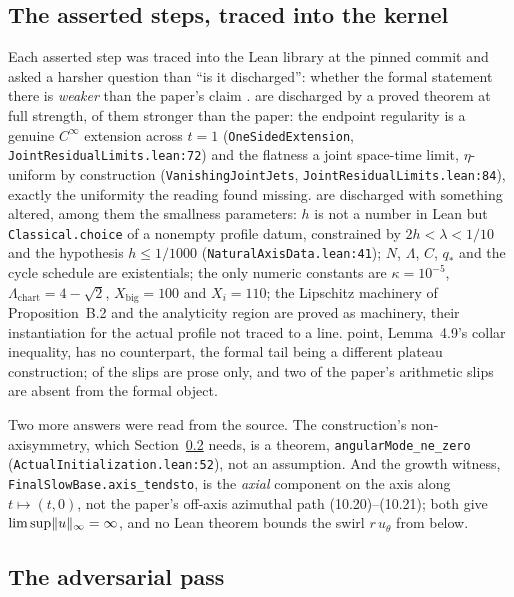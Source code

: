 \documentclass[11pt]{article}
\newcommand{\lean}[1]{\texttt{#1}}
\begin{document}
\subsection{The asserted steps, traced into the kernel}\label{sec:traced}

Each asserted step was traced into the Lean library at the pinned commit and asked a harsher
question than ``is it discharged'': whether the formal statement there is \emph{weaker}
than the paper's claim \cite{Records}. \TracedFull{} are discharged by a proved theorem at
full strength, \TracedStronger{} of them stronger than the paper: the endpoint regularity is
a genuine $C^\infty$ extension across $t=1$ (\lean{OneSidedExtension},
\lean{JointResidualLimits.lean:72}) and the flatness a joint space-time limit,
$\eta$-uniform by construction (\lean{VanishingJointJets},
\lean{JointResidualLimits.lean:84}), exactly the uniformity the reading found missing.
\TracedAltered{} are discharged with something altered, among them the smallness
parameters: $h$ is not a number in Lean but \lean{Classical.choice} of a nonempty profile
datum, constrained by $2h<\lambda<1/10$ and the hypothesis $h\le1/1000$
(\lean{NaturalAxisData.lean:41}); $N$, $\Lambda$, $C$, $q_*$ and the cycle schedule are
existentials; the only numeric constants are $\kappa=10^{-5}$,
$\Lambda_{\mathrm{chart}}=4-\sqrt2$, $X_{\mathrm{big}}=100$ and $X_i=110$; the Lipschitz
machinery of Proposition~B.2 and the analyticity region are proved as machinery, their
instantiation for the actual profile not traced to a line. \TracedNone{} point, Lemma~4.9's
collar inequality, has no counterpart, the formal tail being a different plateau
construction; \SlipsProseOnly{} of the slips are prose only, and two of the paper's
arithmetic slips are absent from the formal object.

Two more answers were read from the source. The construction's non-axisymmetry, which
Section~\ref{sec:obstructions} needs, is a theorem, \lean{angularMode\_ne\_zero}
(\lean{ActualInitialization.lean:52}), not an assumption. And the growth witness,
\lean{FinalSlowBase.axis\_tendsto}, is the \emph{axial} component on the axis along
$t\mapsto(t,0)$, not the paper's off-axis azimuthal path (10.20)--(10.21); both give
$\limsup\lVert u \rVert_\infty=\infty$, and no Lean theorem bounds the swirl $r\,u_\theta$ from below.

\subsection{The adversarial pass}\label{sec:obstructions}
\end{document}
